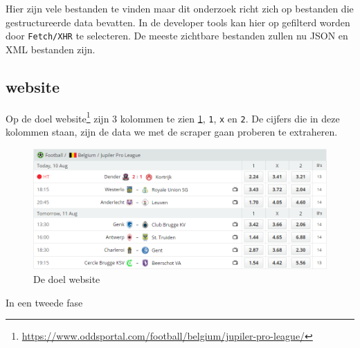 Hier zijn vele bestanden te vinden maar dit onderzoek richt zich op bestanden die gestructureerde data bevatten. In de developer tools kan hier op gefilterd worden door \texttt{Fetch/XHR} te selecteren. De meeste zichtbare bestanden zullen nu JSON en XML bestanden zijn.

\subsection{website}
Op de doel website\footnote{\url{https://www.oddsportal.com/football/belgium/jupiler-pro-league/}} zijn 3 kolommen te zien \ref{fig:website1}, \texttt{1}, \texttt{x} en \texttt{2}. De cijfers die in deze kolommen staan, zijn de data we met de scraper gaan proberen te extraheren.

\begin{figure}[h]
    \centering
    \includegraphics[width=\linewidth]{graphics/website1.png}
    \caption{De doel website}
    \label{fig:website1}
\end{figure}

In een tweede fase 